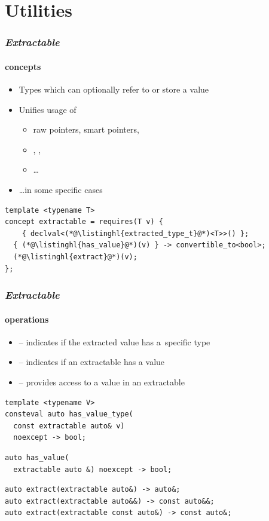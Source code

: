 \documentclass[compress,table,xcolor=table]{beamer}
\begin{document}
\section{Utilities}
\begin{frame}[fragile]
  \frametitle{\em Extractable}
  \framesubtitle{concepts}
  \larger
  \begin{itemize}
    \item Types which can optionally refer to or store a value
    \item Unifies usage of
    \begin{itemize}
      \item raw pointers, smart pointers,
      \item {}, ,
      \item \ldots
    \end{itemize}
    \item \ldots in some specific cases
  \end{itemize}
  \begin{lstlisting}[language=c++2x,basicstyle=\normalsize\ttfamily]
template <typename T>
concept extractable = requires(T v) {
	{ declval<(*@\listinghl{extracted_type_t}@*)<T>>() };
  { (*@\listinghl{has_value}@*)(v) } -> convertible_to<bool>;
  (*@\listinghl{extract}@*)(v);
};
  \end{lstlisting}
\end{frame}
\begin{frame}[fragile]
  \frametitle{\em Extractable}
  \framesubtitle{operations}
  \begin{itemize}
    \item {} -- indicates if the extracted value has
      a~specific type
    \item {} -- indicates if an extractable has a value
    \item {} -- provides access to a value in an extractable
  \end{itemize}
  \begin{lstlisting}[language=c++2x,basicstyle=\small\ttfamily]
template <typename V>
consteval auto has_value_type(
  const extractable auto& v)
  noexcept -> bool;
  \end{lstlisting}
  \vfill
  \begin{lstlisting}[language=c++2x,basicstyle=\normalsize\ttfamily]
auto has_value(
  extractable auto &) noexcept -> bool;
  \end{lstlisting}
  \begin{lstlisting}[language=c++2x,basicstyle=\footnotesize\ttfamily]
auto extract(extractable auto&) -> auto&;
auto extract(extractable auto&&) -> const auto&&;
auto extract(extractable const auto&) -> const auto&;
  \end{lstlisting}
\end{frame}
\end{document}
